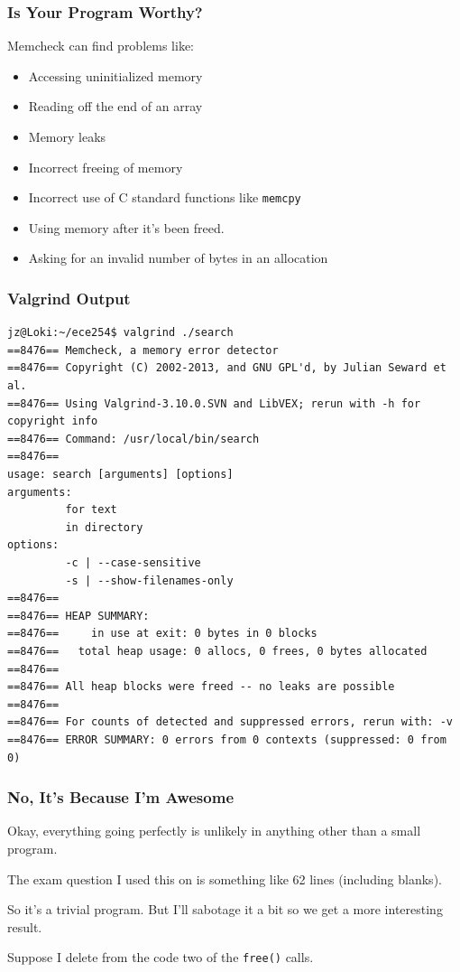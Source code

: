 \begin{frame}
	\frametitle{Is Your Program Worthy?}

	Memcheck can find problems like:
	\begin{itemize}
		\item Accessing uninitialized memory
		\item Reading off the end of an array
		\item Memory leaks
		\item Incorrect freeing of memory
		\item Incorrect use of C standard functions like \texttt{memcpy}
		\item Using memory after it's been freed.
		\item Asking for an invalid number of bytes in an allocation
	\end{itemize}

\end{frame}

\begin{frame}[fragile]
	\frametitle{Valgrind Output}
	{\scriptsize
		\begin{verbatim}
jz@Loki:~/ece254$ valgrind ./search
==8476== Memcheck, a memory error detector
==8476== Copyright (C) 2002-2013, and GNU GPL'd, by Julian Seward et al.
==8476== Using Valgrind-3.10.0.SVN and LibVEX; rerun with -h for copyright info
==8476== Command: /usr/local/bin/search
==8476== 
usage: search [arguments] [options]
arguments:
         for text
         in directory
options:
         -c | --case-sensitive
         -s | --show-filenames-only
==8476== 
==8476== HEAP SUMMARY:
==8476==     in use at exit: 0 bytes in 0 blocks
==8476==   total heap usage: 0 allocs, 0 frees, 0 bytes allocated
==8476== 
==8476== All heap blocks were freed -- no leaks are possible
==8476== 
==8476== For counts of detected and suppressed errors, rerun with: -v
==8476== ERROR SUMMARY: 0 errors from 0 contexts (suppressed: 0 from 0)
\end{verbatim}
	}

\end{frame}

\begin{frame}
	\frametitle{No, It's Because I'm Awesome}

	Okay, everything going perfectly is unlikely in anything other than a small program.

	The exam question I used this on is something like 62 lines (including blanks).

	So it's a trivial program. But I'll sabotage it a bit so we get a more interesting result.

	Suppose I delete from the code two of the \texttt{free()} calls.

\end{frame}


